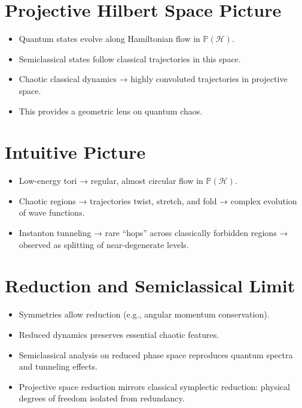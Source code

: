 \documentclass[11pt]{book}
\begin{document}
\section{Projective Hilbert Space Picture}
\begin{itemize}
   \item
 Quantum states evolve along Hamiltonian flow in $\mathbb{P}(\mathcal{H})$.  
   \item
 Semiclassical states follow classical trajectories in this space.  
   \item
 Chaotic classical dynamics → highly convoluted trajectories in projective space.  
   \item
 This provides a geometric lens on quantum chaos.
\end{itemize}

\section{Intuitive Picture}
\begin{itemize}
   \item
 Low-energy tori → regular, almost circular flow in $\mathbb{P}(\mathcal{H})$.  
   \item
 Chaotic regions → trajectories twist, stretch, and fold → complex evolution of wave functions.  
   \item
 Instanton tunneling → rare “hops” across classically forbidden regions → observed as 
        splitting of near-degenerate levels.
\end{itemize}

\section{Reduction and Semiclassical Limit}
\begin{itemize}
   \item
 Symmetries allow reduction (e.g., angular momentum conservation).  
   \item
 Reduced dynamics preserves essential chaotic features.  
   \item
 Semiclassical analysis on reduced phase space reproduces quantum spectra and tunneling effects.  
   \item
 Projective space reduction mirrors classical symplectic reduction: physical degrees of freedom isolated from redundancy.
\end{itemize}
\end{document}
